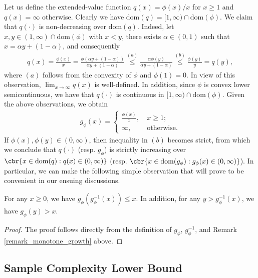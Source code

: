 \documentclass[9pt]{article} %
\numberwithin{equation}{section}
\renewcommand{\frac}[2]{\tfrac{#1}{#2}}
\begin{document}
\begin{remark}\label{remark_monotone_growth}
Let us define the extended-value function $q(x) = \phi(x) / x$ for $x \geq 1$ and $q(x) = \infty$ otherwise. 
Clearly we have $\mathrm{dom}(q) = [1, \infty) \cap \mathrm{dom}(\phi)$.
We claim that $q(\cdot)$ is non-decreasing over $\mathrm{dom}(q)$. 
Indeed, let $x, y \in (1, \infty) \cap \mathrm{dom}(\phi)$ with $x < y$, 
there exists $\alpha \in (0,1)$ such that $x = \alpha y + (1-\alpha)$, and consequently  
\begin{align*}
q(x) = \frac{\phi(x)}{x} = \frac{\phi(\alpha y + (1-\alpha) )}{\alpha y + (1-\alpha)} \overset{(a)}{\leq} \frac{\alpha \phi(y)}{\alpha y + (1-\alpha)} \overset{(b)}{\leq} \frac{\phi(y)}{y} = q(y), 
\end{align*} 
where $(a)$ follows from the convexity of $\phi$ and $\phi(1) = 0$. 
In view of this observation, $\lim_{x \to \infty} q(x)$ is well-defined. 
In addition, since $\phi$ is convex lower semicontinuous, we have that $q(\cdot)$ is continuous in $[1,\infty) \cap \mathrm{dom}(\phi)$. 
Given the above observations, we obtain 
\begin{align}\label{g_phi_simplified}
g_\phi(x) = \begin{cases} \frac{\phi(x)}{x}, ~ & x \geq 1; 
\\
\infty, ~ & \text{otherwise}.
\end{cases}
\end{align}
If  $\phi(x), \phi(y) \in (0, \infty)$, then inequality in $(b)$ becomes strict, from which we conclude that $q(\cdot)$ (resp. $g_\phi$) is strictly increasing over $\cbr{x \in \mathrm{dom}(q): q(x) \in (0,\infty)}$ (resp. $\cbr{x \in \mathrm{dom}(g_\phi): g_\phi(x) \in (0,\infty)}$). 
In particular, we can make the following simple observation that will prove to be convenient in our ensuing discussions. 
\end{remark}

\begin{proposition}\label{prop_inverse_g}
For any $x \geq 0$, we have $g_\phi (g_\phi^{-1}(x)) \leq x$. 
In addition, for any $y > g_\phi^{-1}(x)$, we have $g_\phi(y) > x$. 
\end{proposition}
\begin{proof}
The proof follows directly from the definition of $g_\phi$, $g_\phi^{-1}$, and Remark \ref{remark_monotone_growth} above.
\end{proof}


\subsection{Sample Complexity Lower Bound}
\end{document}
